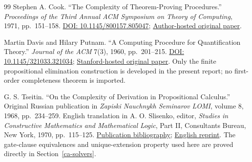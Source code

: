 \begin{thebibliography}{99}
Stephen A. Cook.
``The Complexity of Theorem-Proving Procedures.''
\emph{Proceedings of the Third Annual ACM Symposium on Theory of Computing},
1971, pp.~151--158.
\href{https://doi.org/10.1145/800157.805047}{DOI:
10.1145/800157.805047};
\href{https://www.cs.toronto.edu/~sacook/homepage/1971.pdf}{Author-hosted original paper}.

Martin Davis and Hilary Putnam.
``A Computing Procedure for Quantification Theory.''
\emph{Journal of the ACM} 7(3), 1960, pp.~201--215.
\href{https://doi.org/10.1145/321033.321034}{DOI:
10.1145/321033.321034};
\href{https://web.stanford.edu/class/cs357/DP60.pdf}{Stanford-hosted original paper}.
Only the finite propositional elimination construction is developed in
the present report; no first-order completeness theorem is imported.

G. S. Tseitin.
``On the Complexity of Derivation in Propositional Calculus.''
Original Russian publication in \emph{Zapiski Nauchnykh Seminarov LOMI},
volume 8, 1968, pp.~234--259.
English translation in A. O. Slisenko, editor,
\emph{Studies in Constructive Mathematics and Mathematical Logic}, Part II,
Consultants Bureau, New York, 1970, pp.~115--125.
\href{https://mathsoc.spb.ru/pers/tseytin/bib.html}{Publication bibliography};
\href{https://yurichev.com/mirrors/SAT/Tseitin/Tseitin1968_en.pdf}{English reprint}.
The gate-clause equivalences and unique-extension property used here are
proved directly in Section~\ref{ca-solvers}.

\end{thebibliography}
